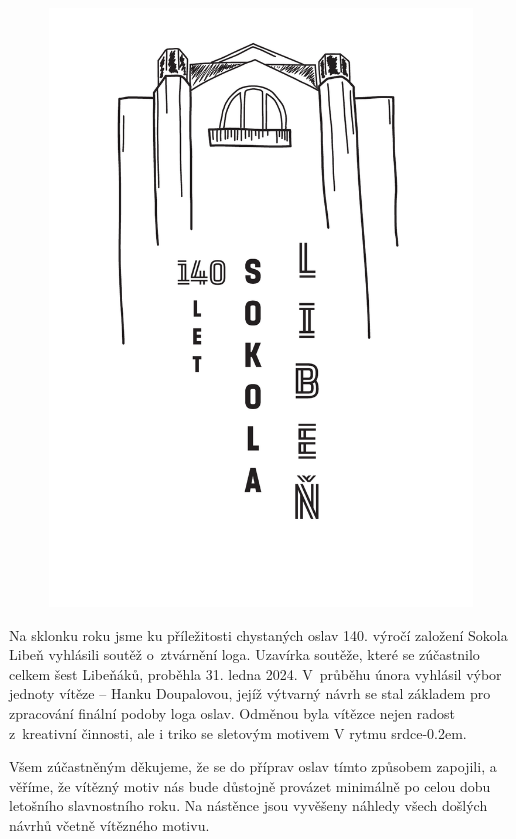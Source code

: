 \documentclass[11pt]{article}
\begin{document}
\setlength{\columnsep}{0pt}%
\begin{figure}
  \includegraphics*[width=1.15\linewidth]{logo-140-vert.pdf}
\end{figure}

Na sklonku roku jsme ku příležitosti chystaných oslav 140. výročí založení Sokola Libeň vyhlásili soutěž o~ztvárnění loga. Uzavírka soutěže, které se zúčastnilo celkem šest \luv{}Libeňáků\ruv{}, proběhla 31. ledna 2024.
V~průběhu února vyhlásil výbor jednoty vítěze – Hanku Doupalovou, jejíž výtvarný návrh se stal základem pro zpracování finální podoby loga oslav. Odměnou byla vítězce nejen radost z~kreativní činnosti, ale i triko se sletovým motivem \luv{}V rytmu srdce\ruv{}\kern-0.2em.

Všem zúčastněným děkujeme, že se do příprav oslav tímto způsobem zapojili, a věříme, že vítězný motiv nás bude důstojně provázet minimálně po celou dobu letošního slavnostního roku. Na nástěnce jsou vyvěšeny náhledy všech došlých návrhů včetně vítězného motivu.
\end{document}
